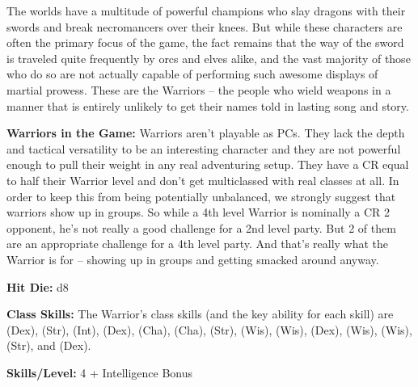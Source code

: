 
The worlds have a multitude of powerful champions who slay dragons with their swords and break necromancers over their knees. But while these characters are often the primary focus of the game, the fact remains that the way of the sword is traveled quite frequently by orcs and elves alike, and the vast majority of those who do so are not actually capable of performing such awesome displays of martial prowess. These are the Warriors -- the people who wield weapons in a manner that is entirely unlikely to get their names told in lasting song and story.

\textbf{Warriors in the Game:} Warriors aren't playable as PCs. They lack the depth and tactical versatility to be an interesting character and they are not powerful enough to pull their weight in any real adventuring setup. They have a CR equal to half their Warrior level and don't get multiclassed with real classes at all. In order to keep this from being potentially unbalanced, we strongly suggest that warriors show up in groups. So while a 4th level Warrior is nominally a CR 2 opponent, he's not really a good challenge for a 2nd level party. But 2 of them are an appropriate challenge for a 4th level party. And that's really what the Warrior is for -- showing up in groups and getting smacked around anyway.

\textbf{Hit Die:} d8

\textbf{Class Skills:} The Warrior's class skills (and the key ability for each skill) are  (Dex),  (Str),  (Int),  (Dex),  (Cha),  (Cha),  (Str),  (Wis),  (Wis),  (Dex),  (Wis),  (Wis),  (Str), and  (Dex).

\textbf{Skills/Level:} 4 + Intelligence Bonus

\goodbab
\poorfor
\poorref
\goodwil

\begin{classtable}
\end{classtable}

\classfeatures

